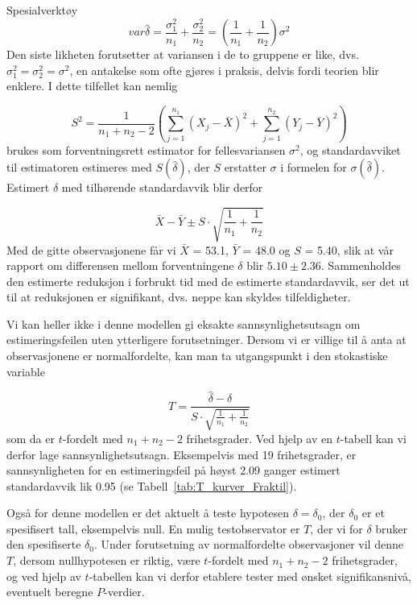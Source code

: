 \begin{eksempel}{Spesialverktøy}
\[ var\hat{\delta}=\frac{{\sigma}_1^2}{n_1}+\frac{{\sigma}_2^2}{n_2}
                  =(\frac{1}{n_1}+\frac{1}{n_2}){\sigma}^2 \]
Den siste likheten forutsetter at variansen i de to gruppene er like,
dvs. ${\sigma}_1^2={\sigma}_2^2={\sigma}^2$, en antakelse som ofte
gjøres i praksis, delvis fordi teorien blir enklere.
I dette tilfellet kan nemlig

\[  S^2=\frac{1}{n_1+n_2-2}( \sum_{j=1}^{n_1}{(X_j-\bar{X})}^2 +
                           \sum_{j=1}^{n_2}{(Y_j-\bar{Y})}^2)      \]
brukes som forventningsrett estimator for fellesvariansen ${\sigma}^2$,
og standardavviket  til estimatoren estimeres med $S(\hat{\delta})$, der
$S$ erstatter $\sigma$ i formelen for $\sigma (\hat{\delta})$.
Estimert $\delta$ med tilhørende standardavvik blir derfor

\[  \bar{X}-\bar{Y} \pm S \cdot \sqrt{\frac{1}{n_1}+\frac{1}{n_2}} \]
Med de gitte observasjonene får vi 
$\bar{X}$ = 53.1, $\bar{Y}$ = 48.0 og $S$ = 5.40, slik at vår rapport
 om differensen mellom forventningene $\delta$ blir $5.10 \pm 2.36$.
Sammenholdes den estimerte reduksjon i forbrukt tid med de estimerte
standardavvik, ser det ut til at reduksjonen er signifikant, dvs. neppe kan
skyldes tilfeldigheter.

Vi kan heller ikke i denne modellen gi eksakte sannsynlighetsutsagn
om estimeringsfeilen uten ytterligere forutsetninger.  Dersom vi er
villige til å anta at observasjonene er normalfordelte, kan man
ta utgangspunkt i den stokastiske variable

\[ T=\frac{\hat{\delta}-{\delta}}{S \cdot
                         \sqrt{\frac{1}{n_1}+\frac{1}{n_2}}} \]
som da er $t$-fordelt med $n_1 + n_2 - 2$ frihetsgrader.  Ved hjelp av
en $t$-tabell kan vi derfor lage sannsynlighetsutsagn.  Eksempelvis
med 19 frihetsgrader, er sannsynligheten for en estimeringsfeil på
høyst 2.09 ganger estimert standardavvik lik 0.95 (se Tabell~\ref{tab:T_kurver_Fraktil}).

Også for denne modellen er det aktuelt å teste 
hypotesen ${\delta} = {\delta}_0$, der ${\delta}_0$ er et spesifisert tall,
eksempelvis null. 
 En mulig testobservator er $T$, der vi for $\delta$ bruker den
spesifiserte ${\delta}_0$.  Under forutsetning av normalfordelte 
observasjoner vil denne $T$, dersom nullhypotesen er riktig, være
$t$-fordelt med $n_1 + n_2 - 2$ frihetsgrader, og ved hjelp av
$t$-tabellen kan vi derfor etablere tester med ønsket signifikansnivå,
eventuelt beregne $P$-verdier. \\


\end{eksempel}
